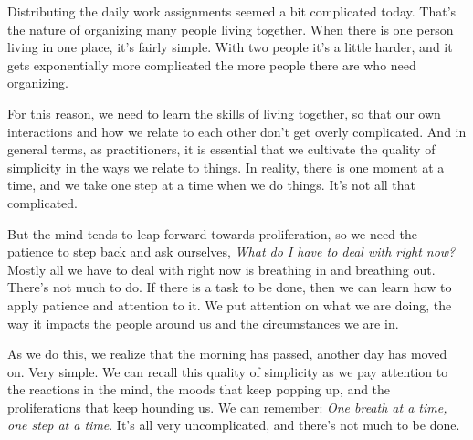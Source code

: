 
Distributing the daily work assignments seemed a bit complicated today. 
That's the nature of organizing many people living together. When there 
is one person living in one place, it's fairly simple. With two people 
it's a little harder, and it gets exponentially more complicated the 
more people there are who need organizing.

For this reason, we need to learn the skills of living together, so 
that our own interactions and how we relate to each other don't get 
overly complicated. And in general terms, as practitioners, it is 
essential that we cultivate the quality of simplicity in the ways we 
relate to things. In reality, there is one moment at a time, and we 
take one step at a time when we do things. It's not all that 
complicated.

But the mind tends to leap forward towards proliferation, so we need 
the patience to step back and ask ourselves, \emph{What do I have to 
deal with right now?} Mostly all we have to deal with right now is 
breathing in and breathing out. There's not much to do. If there is a 
task to be done, then we can learn how to apply patience and attention 
to it. We put attention on what we are doing, the way it impacts the 
people around us and the circumstances we are in.

As we do this, we realize that the morning has passed, another day has 
moved on. Very simple. We can recall this quality of simplicity as we 
pay attention to the reactions in the mind, the moods that keep popping 
up, and the proliferations that keep hounding us. We can remember: 
\emph{One breath at a time, one step at a time}. It's all very 
uncomplicated, and there's not much to be done.

